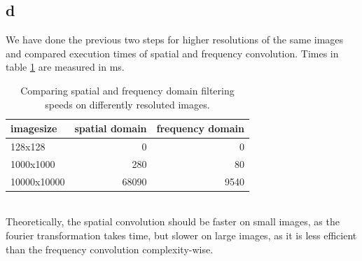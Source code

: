 \documentclass[11pt,a4paper]{article}
\begin{document}
\subsection{d}
We have done the previous two steps for higher resolutions of the same images and compared execution times of spatial and frequency convolution. Times in table \ref{tbl:t4} are measured in ms.
\begin{table}
\begin{tabular}{|l|r|r|}
imagesize&spatial domain&frequency domain\\\hline
128x128&0&0\\
1000x1000&280&80\\
10000x10000&68090&9540\\
\end{tabular}
\caption{Comparing spatial and frequency domain filtering speeds on differently resoluted images.}
\label{tbl:t4}
\end{table}
\\
Theoretically, the spatial convolution should be faster on small images, as the fourier transformation takes time, but slower on large images, as it is less efficient than the frequency convolution complexity-wise.
\end{document}
